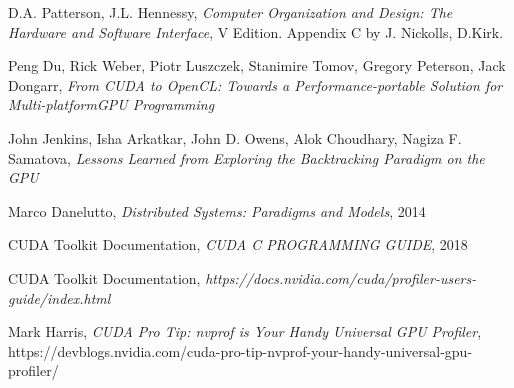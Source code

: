 \documentclass[12pt]{report}
\begin{document}
\renewcommand{\familydefault}{\sfdefault}

\hypersetup {
    colorlinks,
    citecolor= green,
    filecolor= black,
    linkcolor= black,
    urlcolor= black
}

%

	
    
    \tableofcontents
    
    
    
    
    
    
    
    \listoftables
	
	\begin{thebibliography}{9}
		D.A. Patterson, J.L. Hennessy, 
		\textit{Computer Organization and Design: The Hardware and Software Interface}, V Edition. Appendix C by J. Nickolls, D.Kirk.
	
		Peng Du, Rick Weber, Piotr Luszczek, Stanimire Tomov, Gregory Peterson, Jack Dongarr, 
		\textit{From CUDA to OpenCL: Towards a Performance-portable Solution for Multi-platformGPU Programming}
		
		John Jenkins, Isha Arkatkar, John D. Owens, Alok Choudhary, Nagiza F. Samatova, 
		\textit{Lessons Learned from Exploring the Backtracking Paradigm on the GPU}
		
		
		Marco Danelutto,
		\textit{Distributed Systems: Paradigms and Models}, 2014
		
		CUDA Toolkit Documentation, 		
		\textit{CUDA C PROGRAMMING GUIDE}, 2018
		
		CUDA Toolkit Documentation, 
		\textit{https://docs.nvidia.com/cuda/profiler-users-guide/index.html}
		
		Mark Harris, 
		\textit{CUDA Pro Tip: nvprof is Your Handy Universal GPU Profiler}, https://devblogs.nvidia.com/cuda-pro-tip-nvprof-your-handy-universal-gpu-profiler/
		
		
	
	\end{thebibliography}

\end{document}
